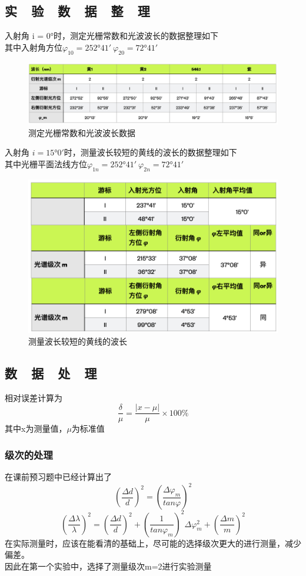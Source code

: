 \documentclass{thuemp}
\begin{document}
\subsection{实~~验~~数~~据~~整~~理}
入射角 i = 0°时，测定光栅常数和光波波长的数据整理如下\\
其中入射角方位$\varphi _{10} = 252°41' \ \varphi _{20} = 72°41'$
\begin{figure}[H]
	\centering
	\includegraphics[width=0.8\linewidth]{./image/1.png}
	\caption{测定光栅常数和光波波长数据} 
	\label{png:1}
\end{figure}
入射角 $i = 15°0'$时，测量波长较短的黄线的波长的数据整理如下\\
其中光栅平面法线方位$\varphi _{1n} = 252°41'\ \varphi _{2n} = 72°41'$
\begin{figure}[H]
	\centering
	\includegraphics[width=0.8\linewidth]{./image/2.png}
	\caption{测量波长较短的黄线的波长} 
	\label{png:2}
\end{figure}
\newpage
\subsection{数~~据~~处~~理}
相对误差计算为
$$\frac{\delta}{\mu}=\frac{|x-\mu|}{\mu}\times 100\%$$
其中x为测量值，$\mu$为标准值
\subsubsection{级次的处理}
在课前预习题中已经计算出了$$(\frac{\Delta d}{d})^2=(\frac{\Delta \varphi _m}{tan\varphi })^2$$
$$(\frac{\Delta \lambda}{\lambda})^2=(\frac{\Delta d }{d})^2+(\frac{1}{tan \varphi _m})^2\Delta\varphi _m^2+(\frac{\Delta m}{m})^2$$
在实际测量时，应该在能看清的基础上，尽可能的选择级次更大的进行测量，减少偏差。\\
因此在第一个实验中，选择了测量级次m=2进行实验测量
\end{document}
